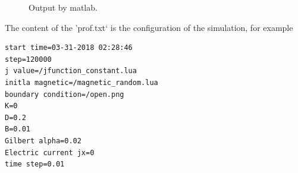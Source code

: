 \documentclass[aps,superscriptaddress,groupedaddress]{revtex4}  %
\begin{document}
\begin{figure}
\hfill
{}\vfill
\caption{\label{Fig:draw}Output by matlab.}
\end{figure}

The content of the 'prof.txt` is the configuration of the simulation, for example
\begin{lstlisting}
start time=03-31-2018 02:28:46
step=120000
j value=/jfunction_constant.lua
initla magnetic=/magnetic_random.lua
boundary condition=/open.png
K=0
D=0.2
B=0.01
Gilbert alpha=0.02
Electric current jx=0
time step=0.01
\end{lstlisting}
\end{document}
